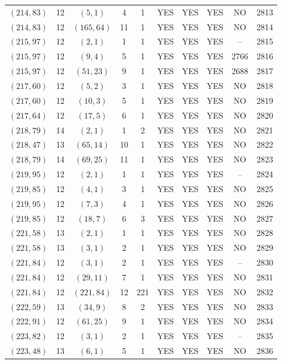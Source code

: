 \begin{longtable}{|c|c|c|c|c|c|c|c|c|c|}
$(214, 83)$ & 12 & $(5, 1)$ & 4 & 1 & YES & YES & YES & NO & 2813\\
$(214, 83)$ & 12 & $(165, 64)$ & 11 & 1 & YES & YES & YES & NO & 2814\\
$(215, 97)$ & 12 & $(2, 1)$ & 1 & 1 & YES & YES & YES & -- & 2815\\
$(215, 97)$ & 12 & $(9, 4)$ & 5 & 1 & YES & YES & YES & 2766 & 2816\\
$(215, 97)$ & 12 & $(51, 23)$ & 9 & 1 & YES & YES & YES & 2688 & 2817\\
$(217, 60)$ & 12 & $(5, 2)$ & 3 & 1 & YES & YES & YES & NO & 2818\\
$(217, 60)$ & 12 & $(10, 3)$ & 5 & 1 & YES & YES & YES & NO & 2819\\
$(217, 64)$ & 12 & $(17, 5)$ & 6 & 1 & YES & YES & YES & NO & 2820\\
$(218, 79)$ & 14 & $(2, 1)$ & 1 & 2 & YES & YES & YES & NO & 2821\\
$(218, 47)$ & 13 & $(65, 14)$ & 10 & 1 & YES & YES & YES & NO & 2822\\
$(218, 79)$ & 14 & $(69, 25)$ & 11 & 1 & YES & YES & YES & NO & 2823\\
$(219, 95)$ & 12 & $(2, 1)$ & 1 & 1 & YES & YES & YES & -- & 2824\\
$(219, 85)$ & 12 & $(4, 1)$ & 3 & 1 & YES & YES & YES & NO & 2825\\
$(219, 95)$ & 12 & $(7, 3)$ & 4 & 1 & YES & YES & YES & NO & 2826\\
$(219, 85)$ & 12 & $(18, 7)$ & 6 & 3 & YES & YES & YES & NO & 2827\\
$(221, 58)$ & 13 & $(2, 1)$ & 1 & 1 & YES & YES & YES & NO & 2828\\
$(221, 58)$ & 13 & $(3, 1)$ & 2 & 1 & YES & YES & YES & NO & 2829\\
$(221, 84)$ & 12 & $(3, 1)$ & 2 & 1 & YES & YES & YES & -- & 2830\\
$(221, 84)$ & 12 & $(29, 11)$ & 7 & 1 & YES & YES & YES & NO & 2831\\
$(221, 84)$ & 12 & $(221, 84)$ & 12 & 221 & YES & YES & YES & NO & 2832\\
$(222, 59)$ & 13 & $(34, 9)$ & 8 & 2 & YES & YES & YES & NO & 2833\\
$(222, 91)$ & 12 & $(61, 25)$ & 9 & 1 & YES & YES & YES & NO & 2834\\
$(223, 82)$ & 12 & $(3, 1)$ & 2 & 1 & YES & YES & YES & -- & 2835\\
$(223, 48)$ & 13 & $(6, 1)$ & 5 & 1 & YES & YES & YES & NO & 2836\\

\end{longtable}
